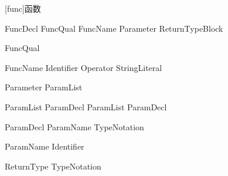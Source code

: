 
[func]{函数}

\begin{bnf}{FuncDecl}
    FuncQual\bnfs {} FuncName Parameter ReturnType\bnfq Block
\end{bnf}

\begin{bnf}{FuncQual}
     \br
\end{bnf}

\begin{bnf}{FuncName}
    Identifier \br
     \br
     \br
     Operator \br
     StringLiteral
\end{bnf}

\begin{bnf}{Parameter}
    \terminal{(} ParamList\bnfq \terminal{)}
\end{bnf}

\begin{bnf}{ParamList}
    ParamDecl \br
    ParamList \terminal{,} ParamDecl
\end{bnf}

\begin{bnf}{ParamDecl}
    ParamName TypeNotation\bnfq
\end{bnf}

\begin{bnf}{ParamName}
    Identifier \br
\end{bnf}

\begin{bnf}{ReturnType}
    \terminal{->} TypeNotation
\end{bnf}